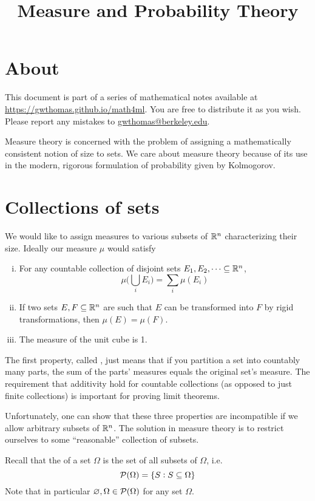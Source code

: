 \documentclass{article}
\title{Measure and Probability Theory}
\begin{document}
\maketitle

\section{About}
This document is part of a series of mathematical notes available at \url{https://gwthomas.github.io/math4ml}.
You are free to distribute it as you wish.
Please report any mistakes to \url{gwthomas@berkeley.edu}.

Measure theory is concerned with the problem of assigning a mathematically consistent notion of size to sets.
We care about measure theory because of its use in the modern, rigorous formulation of probability given by Kolmogorov.

\section{Collections of sets}
We would like to assign measures to various subsets of $\mathbb{R}^n$ characterizing their size.
Ideally our measure $\mu$ would satisfy
\begin{enumerate}[(i)]
\item For any countable collection of disjoint sets $E_1, E_2, \dots \subseteq \mathbb{R}^n$,
\[\mu\bigg(\bigcup_i E_i\bigg) = \sum_i \mu(E_i)\]
\item If two sets $E, F \subseteq \mathbb{R}^n$ are such that $E$ can be transformed into $F$ by rigid transformations, then $\mu(E) = \mu(F)$.
\item The measure of the unit cube is 1.
\end{enumerate}
The first property, called , just means that if you partition a set into countably many parts, the sum of the parts' measures equals the original set's measure.
The requirement that additivity hold for countable collections (as opposed to just finite collections) is important for proving limit theorems.

Unfortunately, one can show that these three properties are incompatible if we allow arbitrary subsets of $\mathbb{R}^n$.
The solution in measure theory is to restrict ourselves to some ``reasonable'' collection of subsets.

Recall that the  of a set $\Omega$ is the set of all subsets of $\Omega$, i.e.
\[\mathcal{P}(\Omega) = \{S : S \subseteq \Omega\}\]
Note that in particular $\varnothing, \Omega \in \mathcal{P}(\Omega)$ for any set $\Omega$.
\end{document}
